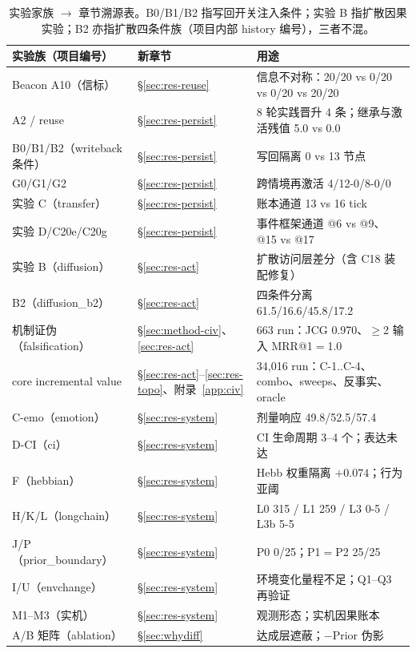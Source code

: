 \documentclass[10pt,a4paper]{ctexart}
\begin{document}
\begin{table}[ht]
\centering\small
\caption{实验家族 $\rightarrow$ 章节溯源表。B0/B1/B2 指写回开关注入条件；实验 B 指扩散因果实验；B2 亦指扩散四条件族（项目内部 history 编号），三者不混。}
\label{tab:family}
\begin{tabular}{L{4.6cm}L{3.4cm}L{6.0cm}}
\toprule
\textbf{实验族（项目编号）} & \textbf{新章节} & \textbf{用途} \\
\midrule
Beacon A10（信标） & \S\ref{sec:res-reuse} & 信息不对称：20/20 vs 0/20 vs 0/20 vs 20/20 \\
A2 / reuse & \S\ref{sec:res-persist} & 8 轮实践晋升 4 条；继承与激活残值 5.0 vs 0.0 \\
B0/B1/B2（writeback 条件） & \S\ref{sec:res-persist} & 写回隔离 0 vs 13 节点 \\
G0/G1/G2 & \S\ref{sec:res-persist} & 跨情境再激活 4/12-0/8-0/0 \\
实验 C（transfer） & \S\ref{sec:res-persist} & 账本通道 13 vs 16 tick \\
实验 D/C20e/C20g & \S\ref{sec:res-persist} & 事件框架通道 @6 vs @9、@15 vs @17 \\
实验 B（diffusion） & \S\ref{sec:res-act} & 扩散访问层差分（含 C18 装配修复） \\
B2（diffusion\_b2） & \S\ref{sec:res-act} & 四条件分离 61.5/16.6/45.8/17.2 \\
机制证伪（falsification） & \S\ref{sec:method-civ}、\ref{sec:res-act} & 663 run：JCG 0.970、$\ge$2 输入 MRR@1$=$1.0 \\
core incremental value & \S\ref{sec:res-act}--\ref{sec:res-topo}、附录~\ref{app:civ} & 34{,}016 run：C-1..C-4、combo、sweeps、反事实、oracle \\
C-emo（emotion） & \S\ref{sec:res-system} & 剂量响应 49.8/52.5/57.4 \\
D-CI（ci） & \S\ref{sec:res-system} & CI 生命周期 3--4 个；表达未达 \\
F（hebbian） & \S\ref{sec:res-system} & Hebb 权重隔离 $+0.074$；行为亚阈 \\
H/K/L（longchain） & \S\ref{sec:res-system} & L0 315 / L1 259 / L3 0-5 / L3b 5-5 \\
J/P（prior\_boundary） & \S\ref{sec:res-system} & P0 0/25；P1$=$P2 25/25 \\
I/U（envchange） & \S\ref{sec:res-system} & 环境变化量程不足；Q1--Q3 再验证 \\
M1--M3（实机） & \S\ref{sec:res-system} & 观测形态；实机因果账本 \\
A/B 矩阵（ablation） & \S\ref{sec:whydiff} & 达成层遮蔽；$-$Prior 伪影 \\

\end{tabular}
\end{table}
\end{document}
